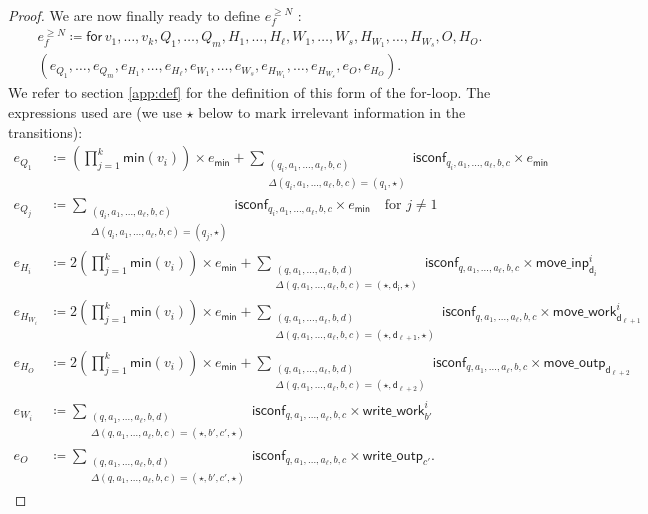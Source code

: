 \begin{proof}
We are now finally ready to define $e_f^{\geq N}$ :
\begin{multline*}
e_f^{\geq N}\coloneqq  \mathsf{for\,} v_1,\ldots,v_{k},Q_1,\ldots,Q_m,H_1,\ldots,H_\ell,W_1,\ldots,W_s, H_{W_1},\ldots,H_{W_s},O,H_O . \\
(e_{Q_1},\ldots,e_{Q_m},e_{H_1},\ldots,e_{H_\ell},e_{W_1},\ldots,e_{W_s},e_{H_{W_1}},\ldots,e_{H_{W_s}},e_{O}, e_{H_O}).
\end{multline*}
We refer to section \ref{app:def} for the definition of this form of the for-loop. The expressions used are (we use $\star$ below to mark irrelevant information in the transitions):
 \allowdisplaybreaks
\begin{align*}
	e_{Q_1}&\coloneqq \left(\prod_{j=1}^{k} \textsf{min}(v_i)\right)\times e_{\mathsf{min}}
	+ \sum_{\substack{(q_i,a_1,\ldots,a_\ell,b,c)\\
	\Delta(q_i,a_1,\ldots,a_\ell,b,c)=(q_1,\star)}} \!\!\!\!\!\!\!\!\! \mathsf{isconf}_{q_i,a_1,\ldots,a_\ell,b,c}\times e_{\mathsf{min}} \\
	e_{Q_j}&\coloneqq \sum_{\substack{(q_i,a_1,\ldots,a_\ell,b,c)\\
	\Delta(q_i,a_1,\ldots,a_\ell,b,c)=(q_j,\star)}} \!\!\!\!\!\!\!\!\! \mathsf{isconf}_{q_i,a_1,\ldots,a_\ell,b,c}\times e_{\mathsf{min}}
	 \quad \text{for $j\neq 1$}\\
	e_{H_i}&\coloneqq 2\left(\prod_{j=1}^{k} \textsf{min}(v_i)\right)\times e_{\mathsf{min}}
	+\sum_{\substack{(q,a_1,\ldots,a_\ell,b,d)\\
	\Delta(q,a_1,\ldots,a_\ell,b,c)=(\star,\mathsf{d_i},\star)}}\!\!\!\!\!\!\!\!\! \mathsf{isconf}_{q,a_1,\ldots,a_\ell,b,c}\times\mathsf{move\_inp}^i_{\mathsf{d}_i}\\
	e_{H_{W_i}}&\coloneqq 2\left(\prod_{j=1}^{k} \textsf{min}(v_i)\right)\times e_{\mathsf{min}}
	+\sum_{\substack{(q,a_1,\ldots,a_\ell,b,d)\\
	\Delta(q,a_1,\ldots,a_\ell,b,c)=(\star,\mathsf{d_{\ell+1}},\star)}}\!\!\!\!\!\!\!\!\! \mathsf{isconf}_{q,a_1,\ldots,a_\ell,b,c}\times\mathsf{move\_work}_{\mathsf{d}_{\ell+1}}^i\\
	e_{H_O}&\coloneqq 2\left(\prod_{j=1}^{k} \textsf{min}(v_i)\right)\times e_{\mathsf{min}}
	+\sum_{\substack{(q,a_1,\ldots,a_\ell,b,d)\\
	\Delta(q,a_1,\ldots,a_\ell,b,c)=(\star,\mathsf{d}_{\ell+2})}}\!\!\!\!\!\!\!\!\! \mathsf{isconf}_{q,a_1,\ldots,a_\ell,b,c}\times\mathsf{move\_outp}_{\mathsf{d}_{\ell+2}}\\
	e_{W_i}&\coloneqq \sum_{\substack{(q,a_1,\ldots,a_\ell,b,d)\\
	\Delta(q,a_1,\ldots,a_\ell,b,c)=(\star,b',c',\star)}}\!\!\!\!\!\!\!\!\! \mathsf{isconf}_{q,a_1,\ldots,a_\ell,b,c}\times\mathsf{write\_work}_{b'}^i\\
	e_{O}&\coloneqq \sum_{\substack{(q,a_1,\ldots,a_\ell,b,d)\\
	\Delta(q,a_1,\ldots,a_\ell,b,c)=(\star,b',c',\star)}}\!\!\!\!\!\!\!\!\! \mathsf{isconf}_{q,a_1,\ldots,a_\ell,b,c}\times\mathsf{write\_outp}_{c'}.
\end{align*}


\end{proof}
